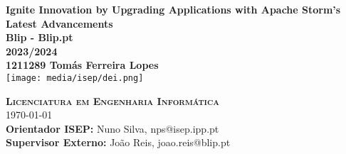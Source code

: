 \begin{center}

    \center

    {\huge \bfseries Ignite Innovation by Upgrading Applications with Apache Storm's Latest Advancements}\\[.5cm]

    {\bfseries Blip - Blip.pt }\\[1cm]

    {\Large \bfseries 2023/2024}\\[2cm]

    {\Large\bf 1211289 Tomás Ferreira Lopes }\\[2.5cm]


    \texttt{[image: media/isep/dei.png]}

    \vfill

    \textsc{
        \Large \bfseries Licenciatura em Engenharia Informática
    }
    \HRuleFront
    \\[.5cm]

    {\Large \monthyeardate\today}\\[1cm]

    {{\small\bf Orientador ISEP:  } {\small Nuno Silva, nps@isep.ipp.pt}} \\[4pt]
    {{\small\bf Supervisor Externo:} {\small João Reis, joao.reis@blip.pt}} \\[4pt]

\end{center}
